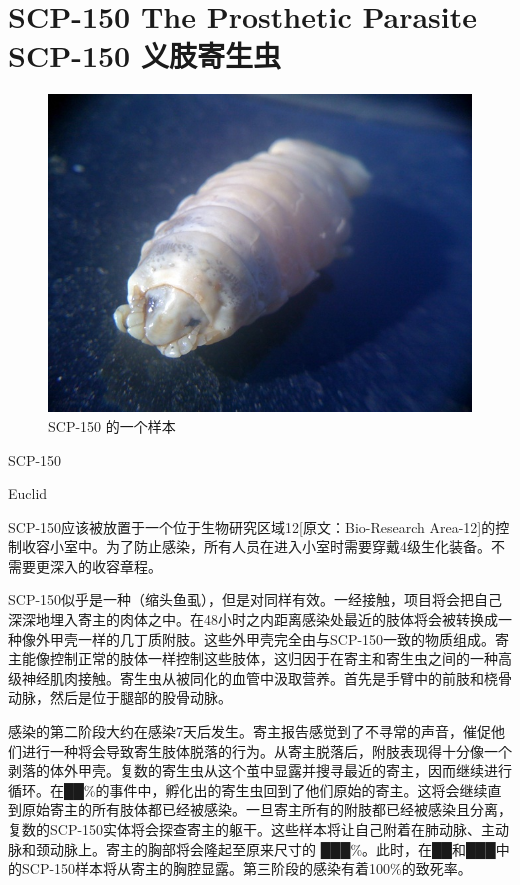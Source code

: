 \chapter[SCP-150 义肢寄生虫]{
    SCP-150 The Prosthetic Parasite\\
    SCP-150 义肢寄生虫
}

\label{chap:SCP-150}

\begin{figure}[H]
    \centering
    \includegraphics[width=0.5\linewidth]{images/SCP.150.jpg}
    \caption*{SCP-150 的一个样本}
\end{figure}

SCP-150

Euclid

SCP-150应该被放置于一个位于生物研究区域12{[}原文：Bio-Research Area-12]的控制收容小室中。为了防止感染，所有人员在进入小室时需要穿戴4级生化装备。不需要更深入的收容章程。

SCP-150似乎是一种（缩头鱼虱），但是对同样有效。一经接触，项目将会把自己深深地埋入寄主的肉体之中。在48小时之内距离感染处最近的肢体将会被转换成一种像外甲壳一样的几丁质附肢。这些外甲壳完全由与SCP-150一致的物质组成。寄主能像控制正常的肢体一样控制这些肢体，这归因于在寄主和寄生虫之间的一种高级神经肌肉接触。寄生虫从被同化的血管中汲取营养。首先是手臂中的前肢和桡骨动脉，然后是位于腿部的股骨动脉。

感染的第二阶段大约在感染7天后发生。寄主报告感觉到了不寻常的声音，催促他们进行一种将会导致寄生肢体脱落的行为。从寄主脱落后，附肢表现得十分像一个剥落的体外甲壳。复数的寄生虫从这个茧中显露并搜寻最近的寄主，因而继续进行循环。在██\%的事件中，孵化出的寄生虫回到了他们原始的寄主。这将会继续直到原始寄主的所有肢体都已经被感染。一旦寄主所有的附肢都已经被感染且分离，复数的SCP-150实体将会探查寄主的躯干。这些样本将让自己附着在肺动脉、主动脉和颈动脉上。寄主的胸部将会隆起至原来尺寸的 ███\%。此时，在██和███中的SCP-150样本将从寄主的胸腔显露。第三阶段的感染有着100\%的致死率。
